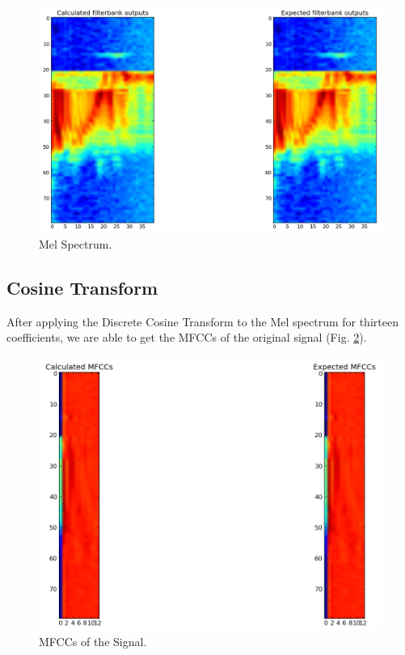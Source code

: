 \documentclass[12pt,a4paper,oneside]{article}
\begin{document}
\begin{figure}
\centering
\includegraphics[scale=0.4]{../mspec.png}
\caption{Mel Spectrum.}
\label{fig:mspec}
\end{figure}

\subsection{Cosine Transform}
After applying the Discrete Cosine Transform to the Mel spectrum for thirteen coefficients, we are able to get the MFCCs of the original signal (Fig. \ref{fig:mfcc}).

\begin{figure}
\centering
\includegraphics[scale=0.4]{../mfcc.png}
\caption{MFCCs of the Signal.}
\label{fig:mfcc}
\end{figure}
\end{document}
